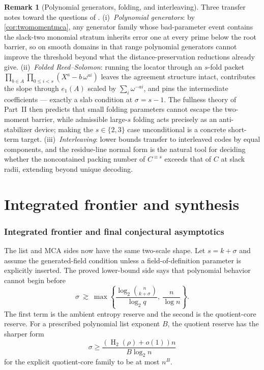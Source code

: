 \documentclass[11pt]{article}
\theoremstyle{definition}
\newtheorem{remark}[remark]{Remark}
\newcommand{\HH}{\operatorname{H}_2}
\begin{document}
\begin{remark}[Polynomial generators, folding, and interleaving]\label{rem:generators}
Three transfer notes toward the questions of \cite{ABF26}.  (i)~\emph{Polynomial generators}: by \cref{cor:twomomentmca}, any generator family whose bad-parameter event contains the slack-two monomial stratum inherits error one at every prime below the root barrier, so on smooth domains in that range polynomial generators \cite{BCGM25} cannot improve the threshold beyond what the distance-preservation reductions already give.  (ii)~\emph{Folded Reed--Solomon}: running the locator through an $s$-fold packet $\prod_{b\in A}\prod_{0\le i<s}(X^{a}-b\,\omega^{ai})$ leaves the agreement structure intact, contributes the slope through $e_1(A)$ scaled by $\sum_i\omega^{-ai}$, and pins the intermediate coefficients --- exactly a slab condition at $\sigma=s-1$.  The fullness theory of Part~II then predicts that small folding parameters cannot escape the two-moment barrier, while admissible large-$s$ folding \cite{GG25} acts precisely as an anti-stabilizer device; making the $s\in\{2,3\}$ case unconditional is a concrete short-term target.  (iii)~\emph{Interleaving}: lower bounds transfer to interleaved codes by equal components, and the residue-line normal form is the natural tool for deciding whether the noncontained packing number of $C^{\equiv s}$ exceeds that of $C$ at slack radii, extending \cite{DG25} beyond unique decoding.
\end{remark}

\part{Integrated frontier and synthesis}

\section{Integrated frontier and final conjectural asymptotics}\label{sec:integrated-frontier}

The list and MCA sides now have the same two-scale shape.  Let $s=k+\sigma$ and assume the generated-field condition unless a field-of-definition parameter is explicitly inserted.  The proved lower-bound side says that polynomial behavior cannot begin before
\[
        \sigma\ \gtrsim\ \max\left\{
        \frac{\log_2\binom n{k+\sigma}}{\log_2 q},\ \frac{n}{\log n}
        \right\}.
\]
The first term is the ambient entropy reserve and the second is the quotient-core reserve.  For a prescribed polynomial list exponent $B$, the quotient reserve has the sharper form
\[
        \sigma\ge \frac{(\HH(\rho)+o(1))n}{B\log_2 n}
\]
for the explicit quotient-core family to be at most $n^B$.
\end{document}
